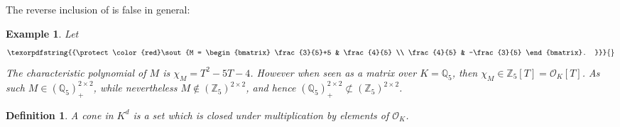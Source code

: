 \documentclass[sigconf]{acmart}
\newtheorem{definition}[theorem]{Definition}
\newtheorem{example}[theorem]{Example}
\newcommand{\OK}{\mathcal{O}_K}
\providecommand{\DIFaddtex}[1]{{\protect\color{blue}\uwave{#1}}} %
\providecommand{\DIFdeltex}[1]{{\protect\color{red}\sout{#1}}}                      %
\providecommand{\DIFaddbegin}{} %
\providecommand{\DIFaddend}{} %
\providecommand{\DIFdelbegin}{} %
\providecommand{\DIFdelend}{} %
\providecommand{\DIFadd}[1]{\texorpdfstring{\DIFaddtex{#1}}{#1}} %
\providecommand{\DIFdel}[1]{\texorpdfstring{\DIFdeltex{#1}}{}} %
\newcommand{\DIFscaledelfig}{0.5}
\newlength{\DIFdelgraphicswidth} %
\newlength{\DIFdelgraphicsheight} %
\newcommand{\DIFaddincludegraphics}[2][]{{\color{blue}\fbox{\DIFOincludegraphics[#1]{#2}}}} %
\newcommand{\DIFdelincludegraphics}[2][]{%
\sbox{\DIFdelgraphicsbox}{\DIFOincludegraphics[#1]{#2}}%
\settoboxwidth{\DIFdelgraphicswidth}{\DIFdelgraphicsbox} %
\settoboxtotalheight{\DIFdelgraphicsheight}{\DIFdelgraphicsbox} %
\scalebox{\DIFscaledelfig}{%
\parbox[b]{\DIFdelgraphicswidth}{\usebox{\DIFdelgraphicsbox}\\[-\baselineskip] \rule{\DIFdelgraphicswidth}{0em}}\llap{\resizebox{\DIFdelgraphicswidth}{\DIFdelgraphicsheight}{%
\setlength{\unitlength}{\DIFdelgraphicswidth}%
\begin{picture}(1,1)%
\thicklines\linethickness{2pt} %
{\color[rgb]{1,0,0}\put(0,0){\framebox(1,1){}}}%
{\color[rgb]{1,0,0}\put(0,0){\line( 1,1){1}}}%
{\color[rgb]{1,0,0}\put(0,1){\line(1,-1){1}}}%
\end{picture}%
}\hspace*{3pt}}} %
} %
\DeclareRobustCommand{\DIFaddbegin}{\DIFOaddbegin \let\includegraphics\DIFaddincludegraphics} %
\DeclareRobustCommand{\DIFaddend}{\DIFOaddend \let\includegraphics\DIFOincludegraphics} %
\DeclareRobustCommand{\DIFdelbegin}{\DIFOdelbegin \let\includegraphics\DIFdelincludegraphics} %
\DeclareRobustCommand{\DIFdelend}{\DIFOaddend \let\includegraphics\DIFOincludegraphics} %
\begin{document}
\DIFdelend The reverse inclusion of  is false in general:
\DIFdelbegin %

\DIFdelend \begin{example}
  Let
  \DIFdelbegin \begin{displaymath}
  \DIFdel{M = \begin{bmatrix} \frac{3}{5}+5 & \frac{4}{5} \\ \frac{4}{5} & -\frac{3}{5} \end{bmatrix}.
  }\end{displaymath}%
\DIFdelend \DIFaddbegin \DIFadd{%
\mbox{%
$
  M = \left[\begin{smallmatrix} {3}/{5}+5 & {4}/{5} \\ {4}/{5} & -{3}/{5} \end{smallmatrix}\right].
  $
}%
}\DIFaddend The characteristic polynomial of $M$
  is $\chi_M = T^2-5T-4$. However when seen as a matrix over $K=\mathbb{Q}_5$, then $\chi_M \in \mathbb{Z}_5[T] = \OK[T]$. As such $M \in (\mathbb{Q}_5)^{2 \times 2}_+$, while nevertheless $M \not\in (\mathbb{Z}_5)^{2\times 2}$, and hence
  $(\mathbb{Q}_5)^{2 \times 2}_+ \not\subset (\mathbb{Z}_5)^{2 \times 2}$. 
\end{example}

\begin{definition}
  A \emph{cone} in $K^d$ is a set which is closed under multiplication by elements of $\OK$.
\end{definition}
\end{document}
